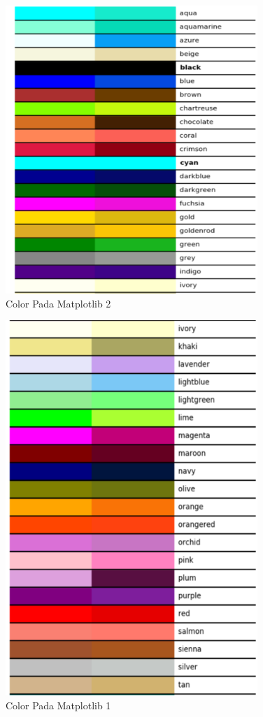 \begin{figure}[!htbp]
	\centerline{\includegraphics[width=0.85\textwidth]{figures/6/wdu.PNG}}
	\caption{Color Pada Matplotlib 2}
	\label{fig:wdu}
\end{figure}   

\begin{figure}[!htbp]
	\centerline{\includegraphics[width=0.85\textwidth]{figures/6/wsa.PNG}}
	\caption{Color Pada Matplotlib 1}
	\label{fig:wsa}
\end{figure}   

